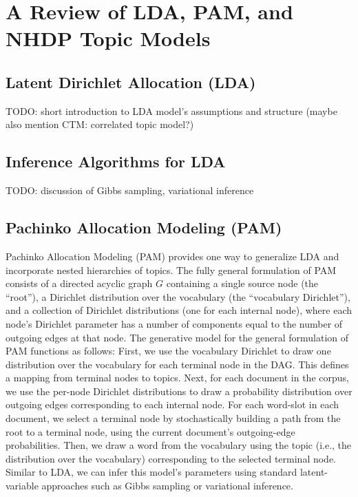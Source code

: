 \documentclass{article}
\theoremstyle{definition}
\begin{document}
\section{A Review of LDA, PAM, and NHDP Topic Models}

\subsection{Latent Dirichlet Allocation (LDA)}

TODO: short introduction to LDA model's assumptions and structure (maybe also mention CTM: correlated topic model?)

\subsection{Inference Algorithms for LDA}

TODO: discussion of Gibbs sampling, variational inference

\subsection{Pachinko Allocation Modeling (PAM)}

Pachinko Allocation Modeling (PAM) provides one way to generalize LDA and incorporate nested hierarchies of topics.
The fully general formulation of PAM consists of a directed acyclic graph $G$ containing a single source node (the ``root''), a Dirichlet distribution over the vocabulary (the ``vocabulary Dirichlet''), and a collection of Dirichlet distributions (one for each internal node), where each node's Dirichlet parameter has a number of components equal to the number of outgoing edges at that node.
The generative model for the general formulation of PAM functions as follows: First, we use the vocabulary Dirichlet to draw one distribution over the vocabulary for each terminal node in the DAG.
This defines a mapping from terminal nodes to topics.
Next, for each document in the corpus, we use the per-node Dirichlet distributions to draw a probability distribution over outgoing edges corresponding to each internal node.
For each word-slot in each document, we select a terminal node by stochastically building a path from the root to a terminal node, using the current document's outgoing-edge probabilities.
Then, we draw a word from the vocabulary using the topic (i.e., the distribution over the vocabulary) corresponding to the selected terminal node.
Similar to LDA, we can infer this model's parameters using standard latent-variable approaches such as Gibbs sampling or variational inference.
\end{document}
